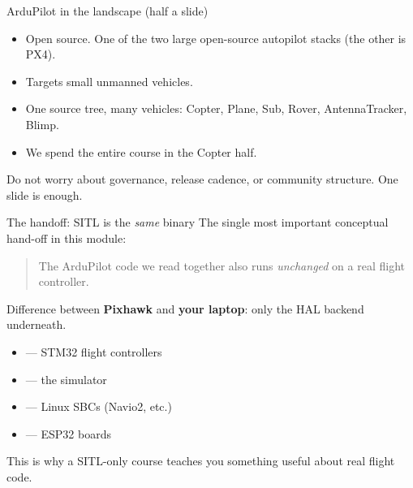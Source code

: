 \documentclass[aspectratio=169,11pt]{beamer}
\begin{document}
\begin{frame}{ArduPilot in the landscape (half a slide)}
  \begin{itemize}
    \item Open source. One of the two large open-source autopilot stacks (the other is PX4).
    \item Targets small unmanned vehicles.
    \item One source tree, many vehicles: Copter, Plane, Sub, Rover, AntennaTracker, Blimp.
    \item We spend the entire course in the Copter half.
  \end{itemize}
  \vfill
  Do not worry about governance, release cadence, or community structure. One slide is enough.
\end{frame}

\begin{frame}{The handoff: SITL is the \emph{same} binary}
  The single most important conceptual hand-off in this module:\\[1ex]
  \begin{quote}
    The ArduPilot code we read together also runs \emph{unchanged} on a real flight controller.
  \end{quote}
  Difference between \textbf{Pixhawk} and \textbf{your laptop}: only the HAL backend underneath.
  \begin{itemize}
    \item {} --- STM32 flight controllers
    \item {} --- the simulator
    \item {} --- Linux SBCs (Navio2, etc.)
    \item {} --- ESP32 boards
  \end{itemize}
  This is why a SITL-only course teaches you something useful about real flight code.
\end{frame}
\end{document}
